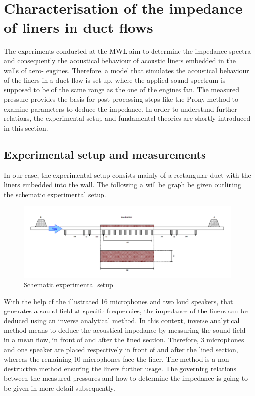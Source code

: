 \documentclass[11pt]{report} %
\begin{document}
\section{Characterisation of the impedance of liners in duct flows}
The experiments conducted at the MWL aim to determine the impedance spectra and consequently the acoustical behaviour of acoustic liners embedded in the walls of aero- engines.
Therefore, a model that simulates the acoustical behaviour of the liners in a duct flow is set up, where the applied sound spectrum is supposed to be of the same range as the one of the engines fan.  
The measured pressure provides the basis for post processing steps like the Prony method to examine parameters to deduce the impedance.
In order to understand further relations, the experimental setup and fundamental theories are shortly introduced in this section. 


\subsection{Experimental setup and measurements}
In our case, the experimental setup consists mainly of a rectangular duct with the liners embedded into the wall.
The following a will be graph be given outlining the schematic experimental setup. 

\begin{figure}[H]
\centering
\includegraphics[scale=0.8]{./Figures/experimental_setup}
\caption{Schematic experimental setup}
\end{figure}

With the help of the illustrated 16 microphones and two loud speakers, that generates a sound field at specific frequencies, the impedance of the liners can be deduced using an inverse analytical method.
In this context, inverse analytical method means to deduce the acoustical impedance by measuring the sound field in a mean flow, in front of and after the lined section.
Therefore, 3 microphones and one speaker are placed respectively in front of and after the lined section, whereas the remaining 10 microphones face the liner.
The method is a non destructive method ensuring the liners further usage.
The governing relations between the measured pressures and how to determine the impedance is going to be given in more detail subsequently.
\end{document}
